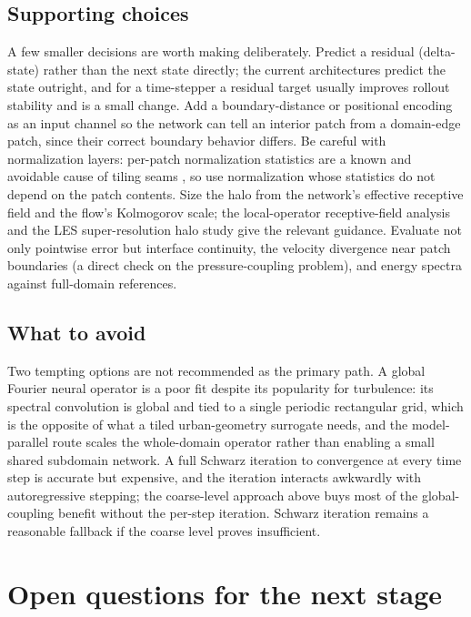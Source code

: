 \documentclass[11pt]{article}
\begin{document}
\subsection*{Supporting choices}

A few smaller decisions are worth making deliberately. Predict a residual
(delta-state) rather than the next state directly; the current architectures
predict the state outright, and for a time-stepper a residual target usually
improves rollout stability and is a small change. Add a boundary-distance or
positional encoding as an input channel so the network can tell an interior patch
from a domain-edge patch, since their correct boundary behavior differs. Be
careful with normalization layers: per-patch normalization statistics are a known
and avoidable cause of tiling seams \cite{buglakova2025tiling}, so use
normalization whose statistics do not depend on the patch contents. Size the halo
from the network's effective receptive field and the flow's Kolmogorov scale; the
local-operator receptive-field analysis \cite{ye2024lno} and the LES
super-resolution halo study give the relevant guidance. Evaluate not only
pointwise error but interface continuity, the velocity divergence near patch
boundaries (a direct check on the pressure-coupling problem), and energy spectra
against full-domain references.

\subsection*{What to avoid}

Two tempting options are not recommended as the primary path. A global Fourier
neural operator \cite{li2021fno} is a poor fit despite its popularity for
turbulence: its spectral convolution is global and tied to a single periodic
rectangular grid, which is the opposite of what a tiled urban-geometry surrogate
needs, and the model-parallel route \cite{grady2023modelparallelfno} scales the
whole-domain operator rather than enabling a small shared subdomain network. A
full Schwarz iteration to convergence at every time step
\cite{li2020deepddm,huang2025operatorddm} is accurate but expensive, and the
iteration interacts awkwardly with autoregressive stepping; the coarse-level
approach above buys most of the global-coupling benefit without the per-step
iteration. Schwarz iteration remains a reasonable fallback if the coarse level
proves insufficient.

\section{Open questions for the next stage}
\end{document}
